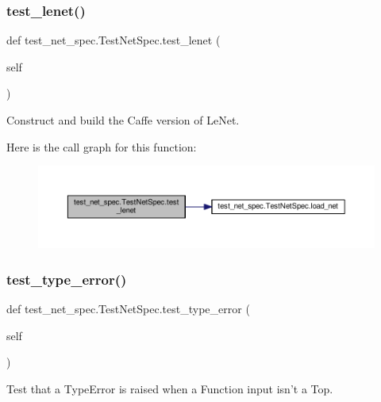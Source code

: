 \subsubsection{\texorpdfstring{test\+\_\+lenet()}{test\_lenet()}}
{\footnotesize\ttfamily def test\+\_\+net\+\_\+spec.\+Test\+Net\+Spec.\+test\+\_\+lenet (\begin{DoxyParamCaption}\item[{}]{self }\end{DoxyParamCaption})}

\begin{DoxyVerb}Construct and build the Caffe version of LeNet.\end{DoxyVerb}
 Here is the call graph for this function\+:
\nopagebreak
\begin{figure}[H]
\begin{center}
\leavevmode
\includegraphics[width=350pt]{classtest__net__spec_1_1_test_net_spec_ade38b214954610b0074929e832e26330_cgraph}
\end{center}
\end{figure}
\mbox{\label{classtest__net__spec_1_1_test_net_spec_a31644344d9edbc6fc7150a555171ec91}} 
\subsubsection{\texorpdfstring{test\+\_\+type\+\_\+error()}{test\_type\_error()}}
{\footnotesize\ttfamily def test\+\_\+net\+\_\+spec.\+Test\+Net\+Spec.\+test\+\_\+type\+\_\+error (\begin{DoxyParamCaption}\item[{}]{self }\end{DoxyParamCaption})}

\begin{DoxyVerb}Test that a TypeError is raised when a Function input isn't a Top.\end{DoxyVerb}
 \mbox{\label{classtest__net__spec_1_1_test_net_spec_a91021c09c7d6750cba8a8a1a05749ad6}} 
